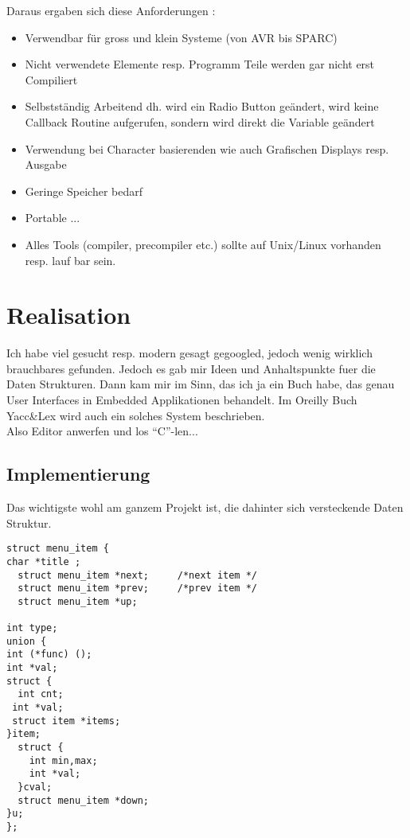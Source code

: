\documentclass[a4paper]{article}
\begin{document}
Daraus ergaben sich diese Anforderungen :
 
\begin{itemize}
\item Verwendbar für gross und klein Systeme (von AVR bis SPARC)
\item Nicht verwendete Elemente resp. Programm Teile werden gar nicht erst Compiliert
\item Selbstständig Arbeitend dh. wird ein Radio Button geändert, wird keine Callback Routine aufgerufen, sondern wird direkt die Variable geändert
\item Verwendung bei Character basierenden wie auch Grafischen Displays resp. Ausgabe
\item Geringe Speicher bedarf
\item Portable ... 
\item Alles Tools (compiler, precompiler etc.) sollte auf Unix/Linux vorhanden resp. lauf bar sein. 
\end{itemize}


\section{Realisation}

Ich habe viel gesucht resp. modern gesagt gegoogled, jedoch wenig wirklich brauchbares gefunden. Jedoch es gab mir Ideen und Anhaltspunkte fuer die Daten Strukturen. Dann kam mir im Sinn, das ich ja ein Buch habe, das genau User Interfaces in Embedded Applikationen behandelt. Im Oreilly Buch Yacc\&Lex wird auch ein solches System beschrieben.\\
Also Editor anwerfen und los ``C''-len...\\
\subsection{Implementierung}
Das wichtigste wohl am ganzem Projekt ist, die dahinter sich versteckende Daten Struktur.

\begin{lstlisting}[label=item_struct]
struct menu_item {
char *title ;
  struct menu_item *next;     /*next item */
  struct menu_item *prev;     /*prev item */
  struct menu_item *up; 
  
int type;
union {
int (*func) ();
int *val; 
struct {
  int cnt;
 int *val;
 struct item *items;
}item;
  struct {
    int min,max;
    int *val;
  }cval;
  struct menu_item *down;
}u;
};
\end{lstlisting}
\end{document}
